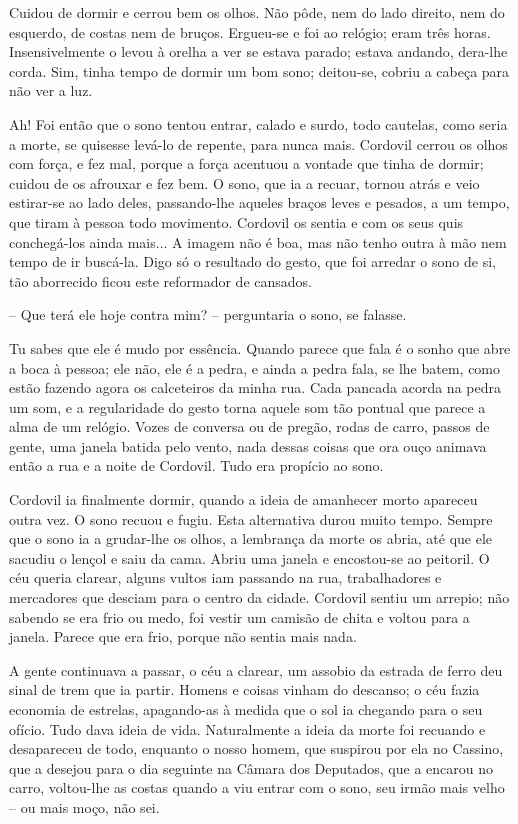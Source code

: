 Cuidou de dormir e cerrou bem os olhos. Não pôde, nem do lado direito,
nem do esquerdo, de costas nem de bruços. Ergueu-se e foi ao relógio;
eram três horas. Insensivelmente o levou à orelha a ver se estava
parado; estava andando, dera-lhe corda. Sim, tinha tempo de dormir um
bom sono; deitou-se, cobriu a cabeça para não ver a luz.

Ah! Foi então que o sono tentou entrar, calado e surdo, todo cautelas,
como seria a morte, se quisesse levá-lo de repente, para nunca mais.
Cordovil cerrou os olhos com força, e fez mal, porque a força acentuou a
vontade que tinha de dormir; cuidou de os afrouxar e fez bem. O sono,
que ia a recuar, tornou atrás e veio estirar-se ao lado deles,
passando-lhe aqueles braços leves e pesados, a um tempo, que tiram à
pessoa todo movimento. Cordovil os sentia e com os seus quis
conchegá-los ainda mais... A imagem não é boa, mas não tenho outra à mão
nem tempo de ir buscá-la. Digo só o resultado do gesto, que foi arredar
o sono de si, tão aborrecido ficou este reformador de cansados.

-- Que terá ele hoje contra mim? -- perguntaria o sono, se falasse.

Tu sabes que ele é mudo por essência. Quando parece que fala é o sonho
que abre a boca à pessoa; ele não, ele é a pedra, e ainda a pedra fala,
se lhe batem, como estão fazendo agora os calceteiros da minha rua. Cada
pancada acorda na pedra um som, e a regularidade do gesto torna aquele
som tão pontual que parece a alma de um relógio. Vozes de conversa ou de
pregão, rodas de carro, passos de gente, uma janela batida pelo vento,
nada dessas coisas que ora ouço animava então a rua e a noite de
Cordovil. Tudo era propício ao sono.

Cordovil ia finalmente dormir, quando a ideia de amanhecer morto
apareceu outra vez. O sono recuou e fugiu. Esta alternativa durou muito
tempo. Sempre que o sono ia a grudar-lhe os olhos, a lembrança da morte
os abria, até que ele sacudiu o lençol e saiu da cama. Abriu uma janela
e encostou-se ao peitoril. O céu queria clarear, alguns vultos iam
passando na rua, trabalhadores e mercadores que desciam para o centro da
cidade. Cordovil sentiu um arrepio; não sabendo se era frio ou medo, foi
vestir um camisão de chita e voltou para a janela. Parece que era frio,
porque não sentia mais nada.

A gente continuava a passar, o céu a clarear, um assobio da estrada de
ferro deu sinal de trem que ia partir. Homens e coisas vinham do
descanso; o céu fazia economia de estrelas, apagando-as à medida que o
sol ia chegando para o seu ofício. Tudo dava ideia de vida. Naturalmente
a ideia da morte foi recuando e desapareceu de todo, enquanto o nosso
homem, que suspirou por ela no Cassino, que a desejou para o dia
seguinte na Câmara dos Deputados, que a encarou no carro, voltou-lhe as
costas quando a viu entrar com o sono, seu irmão mais velho -- ou mais
moço, não sei.

